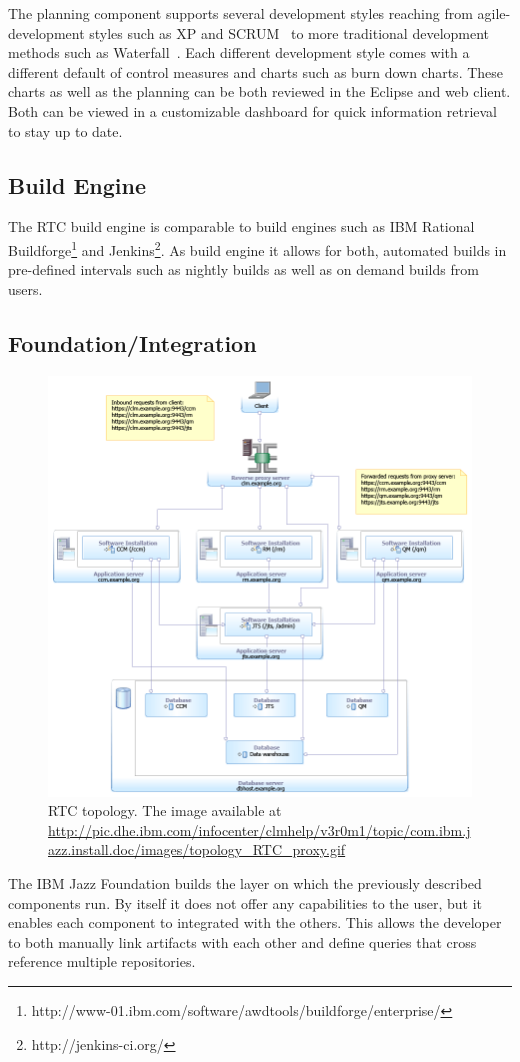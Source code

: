 The planning component supports several development styles reaching from agile-development styles such as XP and SCRUM~\cite{larman:ieeecomputer:2003} to more traditional development methods such as Waterfall~\cite{boehm:senotes:1986}.
Each different development style comes with a different default of control measures and charts such as burn down charts.
These charts as well as the planning can be both reviewed in the Eclipse and web client.
Both can be viewed in a customizable dashboard for quick information retrieval to stay up to date.

\subsection{Build Engine}
The RTC build engine is comparable to build engines such as IBM Rational Buildforge\footnote{http://www-01.ibm.com/software/awdtools/buildforge/enterprise/} and Jenkins\footnote{http://jenkins-ci.org/}.
As build engine it allows for both, automated builds in pre-defined intervals such as nightly builds as well as on demand builds from users.

\subsection{Foundation/Integration}
\begin{figure}
\includegraphics[width=\textwidth]{figures/meet-rtc.tex/rtc-topology}
\caption[blubb]{RTC topology. The image available at \url{http://pic.dhe.ibm.com/infocenter/clmhelp/v3r0m1/topic/com.ibm.jazz.install.doc/images/topology_RTC_proxy.gif}}

\label{fig:rtctopology}
\end{figure}
The IBM Jazz Foundation builds the layer on which the previously described components run.
By itself it does not offer any capabilities to the user, but it enables each component to integrated with the others. 
This allows the developer to both manually link artifacts with each other and define queries that cross reference multiple repositories.


